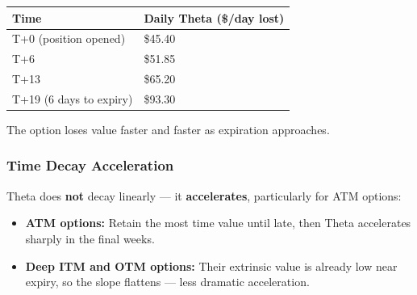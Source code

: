 \documentclass[12pt,openany]{book}
\begin{document}
\begin{center}
\scriptsize
\setlength{\tabcolsep}{3pt}
\begin{tabular}{|L{6.3cm}|L{6.3cm}|}
\hline
\textbf{Time} & \textbf{Daily Theta (\$/day lost)} \\
\hline
T+0 (position opened) & \$45.40 \\
\hline
T+6 & \$51.85 \\
\hline
T+13 & \$65.20 \\
\hline
T+19 (6 days to expiry) & \$93.30 \\
\hline
\end{tabular}
\end{center}

The option loses value faster and faster as expiration approaches.

\subsubsection{Time Decay Acceleration}

Theta does \textbf{not} decay linearly — it \textbf{accelerates}, particularly for ATM options:


\begin{center}
\end{center}


\begin{itemize}[leftmargin=*]
    \item \textbf{ATM options:} Retain the most time value until late, then Theta accelerates sharply in the final weeks.
    \item \textbf{Deep ITM and OTM options:} Their extrinsic value is already low near expiry, so the slope flattens — less dramatic acceleration.
\end{itemize}
\end{document}
